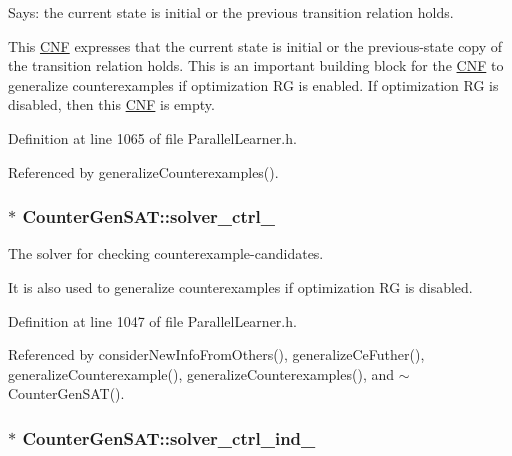 Says\-: the current state is initial or the previous transition relation holds. 

This \hyperlink{classCNF}{C\-N\-F} expresses that the current state is initial or the previous-\/state copy of the transition relation holds. This is an important building block for the \hyperlink{classCNF}{C\-N\-F} to generalize counterexamples if optimization R\-G is enabled. If optimization R\-G is disabled, then this \hyperlink{classCNF}{C\-N\-F} is empty. 

Definition at line 1065 of file Parallel\-Learner.\-h.



Referenced by generalize\-Counterexamples().

\hypertarget{classCounterGenSAT_a8ed22d7411e62b13c50824664e58807a}{
\subsubsection[{solver\-\_\-ctrl\-\_\-}]{$\ast$ Counter\-Gen\-S\-A\-T\-::solver\-\_\-ctrl\-\_\-\hspace{0.3cm}{\ttfamily [protected]}}}\label{classCounterGenSAT_a8ed22d7411e62b13c50824664e58807a}


The solver for checking counterexample-\/candidates. 

It is also used to generalize counterexamples if optimization R\-G is disabled. 

Definition at line 1047 of file Parallel\-Learner.\-h.



Referenced by consider\-New\-Info\-From\-Others(), generalize\-Ce\-Futher(), generalize\-Counterexample(), generalize\-Counterexamples(), and $\sim$\-Counter\-Gen\-S\-A\-T().

\hypertarget{classCounterGenSAT_a33c1b5637bdd766a7d2b8ff2e3147eca}{
\subsubsection[{solver\-\_\-ctrl\-\_\-ind\-\_\-}]{$\ast$ Counter\-Gen\-S\-A\-T\-::solver\-\_\-ctrl\-\_\-ind\-\_\-\hspace{0.3cm}{\ttfamily [protected]}}}\label{classCounterGenSAT_a33c1b5637bdd766a7d2b8ff2e3147eca}


